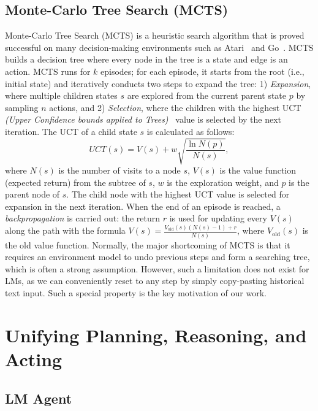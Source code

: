 \documentclass{article} \usepackage{iclr2024_conference,times}
\begin{document}
\subsection{Monte-Carlo Tree Search (MCTS)}
Monte-Carlo Tree Search (MCTS) is a heuristic search algorithm that is proved successful on many decision-making environments such as Atari~\citep{ye2021mastering} and Go~\citep{silver2016mastering}. MCTS builds a decision tree where every node in the tree is a state and edge is an action. MCTS runs for $k$ episodes; for each episode, it starts from the root (i.e., initial state) and iteratively conducts two steps to expand the tree: 1) \textit{Expansion}, where multiple children states $s$ are explored from the current parent state $p$ by sampling $n$ actions, and 2) \textit{Selection}, where the children with the highest UCT \textit{(Upper Confidence bounds applied to Trees)}~\citep{kocsis2006bandit} value is selected by the next iteration. The UCT of a child state $s$ is calculated as follows:
\begin{equation}
UCT(s)=V(s)+w\sqrt{\frac{\ln N(p)}{N(s)}},
\label{eq:uct}
\end{equation}
where $N(s)$ is the number of visits to a node $s$, $V(s)$ is the value function (expected return) from the subtree of $s$, $w$ is the exploration weight, and $p$ is the parent node of $s$. The child node with the highest UCT value is selected for expansion in the next iteration. When the end of an episode is reached, a \textit{backpropagation} is carried out: the return $r$ is used for updating every $V(s)$ along the path 
with the formula $V(s)=\frac{V_{\text{old}}(s)(N(s)-1)+r}{N(s)}$, where $V_{\text{old}}(s)$ is the old value function. Normally, the major shortcoming of MCTS is that it requires an environment model to undo previous steps and form a searching tree, which is often a strong assumption. However, such a limitation does not exist for LMs, as we can conveniently reset to any step by simply copy-pasting historical text input. Such a special property is the key motivation of our work. 





\section{Unifying Planning, Reasoning, and Acting}

\subsection{LM Agent} 
\end{document}
